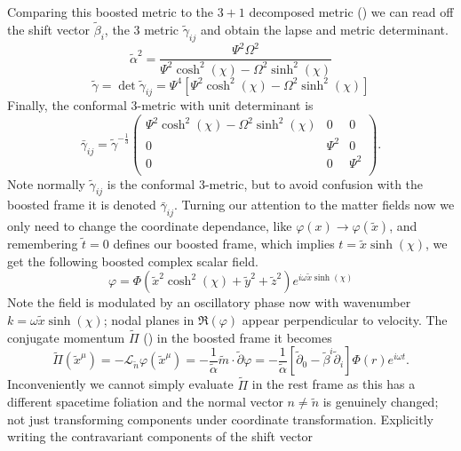 \documentclass[11pt, oneside]{report}  %
\renewcommand{\L}{\mathcal{L}}
\newcommand{\vp}{\varphi}
\numberwithin{equation}{section}
\begin{document}
Comparing this boosted metric to the $3+1$ decomposed metric () we can read off the shift vector $\tilde{\beta}_i$, the 3 metric $\tilde{\gamma}_{ij}$ and obtain the lapse and metric determinant.
\begin{equation} \tilde{\alpha}^2 = \frac{\Psi ^2 \Omega ^2}{\Psi ^2 \cosh ^2(\chi) -\Omega ^2 \sinh ^2(\chi) } \end{equation}
\begin{equation}\tilde{\gamma} = \det \tilde{\gamma}_{ij} = \Psi^4\left[ \Psi^2 \cosh^2 (\chi) - \Omega^2 \sinh^2(\chi)\right]\end{equation}
Finally, the conformal 3-metric with unit determinant is 
\begin{equation} \bar{\gamma}_{ij} = \tilde{\gamma}^{-\frac{1}{3}}\left(
\begin{array}{ccc}
 \Psi ^2 \cosh ^2(\chi) -\Omega ^2 \sinh ^2(\chi)  & 0 & 0 \\
 0 & \Psi ^2 & 0 \\
 0 & 0 & \Psi ^2 \\
\end{array}
\right).\end{equation}
Note normally $\tilde{\gamma}_{ij}$ is the conformal 3-metric, but to avoid confusion with the boosted frame it is denoted $\bar{\gamma}_{ij}$. Turning our attention to the matter fields now we only need to change the coordinate dependance, like $\vp(x)\rightarrow \vp(\tilde{x})$, and remembering $\tilde{t}=0$ defines our boosted frame, which implies $t = \tilde{x}\sinh(\chi)$, we get the following boosted complex scalar field.
\begin{equation}\vp = \Phi(\tilde{x}^2\cosh^2(\chi) +\tilde{y}^2 + \tilde{z}^2)e^{i\omega \tilde{x}\sinh(\chi)} \end{equation}
Note the field is modulated by an oscillatory phase now with wavenumber $k = \omega \tilde{x} \sinh(\chi)$; nodal planes in $\Re(\vp)$ appear perpendicular to velocity. The conjugate momentum $\tilde{\Pi}$ () in the boosted frame it becomes 
\begin{equation} \tilde{\Pi}(\tilde{x}^\mu) = -\L_{\tilde{n}} \vp(\tilde{x}^\mu)=-\frac{1}{\tilde{\alpha}}\tilde{m}\cdot \tilde{\partial}\vp = -\frac{1}{\tilde{\alpha}}\left[ \tilde{\partial}_0 - \tilde{\beta}^i\tilde{\partial}_{i}\right]\Phi(r)e^{i\omega t}.\end{equation}
Inconveniently we cannot simply evaluate $\tilde{\Pi}$ in the rest frame as this has a different spacetime foliation and the normal vector $n\neq \tilde{n}$ is genuinely changed; not just transforming components under coordinate transformation. Explicitly writing the contravariant components of the shift vector 
\end{document}
